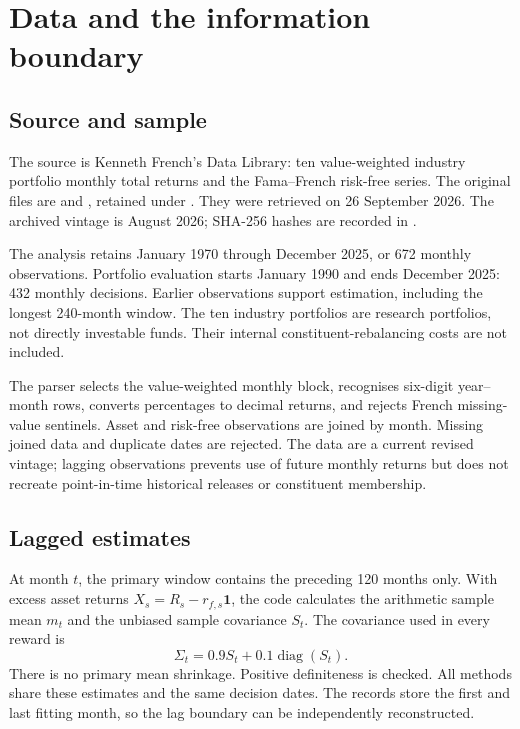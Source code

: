 \documentclass[11pt,a4paper]{article}
\begin{document}
\section{Data and the information boundary}
\subsection{Source and sample}
The source is Kenneth French's Data Library: ten value-weighted industry portfolio monthly total returns and the Fama--French risk-free series. The original files are  and , retained under . They were retrieved on 26 September 2026. The archived vintage is August 2026; SHA-256 hashes are recorded in .

The analysis retains January 1970 through December 2025, or 672 monthly observations. Portfolio evaluation starts January 1990 and ends December 2025: 432 monthly decisions. Earlier observations support estimation, including the longest 240-month window. The ten industry portfolios are research portfolios, not directly investable funds. Their internal constituent-rebalancing costs are not included.

The parser selects the value-weighted monthly block, recognises six-digit year--month rows, converts percentages to decimal returns, and rejects French missing-value sentinels. Asset and risk-free observations are joined by month. Missing joined data and duplicate dates are rejected. The data are a current revised vintage; lagging observations prevents use of future monthly returns but does not recreate point-in-time historical releases or constituent membership.

\subsection{Lagged estimates}
At month $t$, the primary window contains the preceding 120 months only. With excess asset returns $X_s=R_s-r_{f,s}\mathbf1$, the code calculates the arithmetic sample mean $m_t$ and the unbiased sample covariance $S_t$. The covariance used in every reward is
\[
\Sigma_t=0.9S_t+0.1\operatorname{diag}(S_t).
\]
There is no primary mean shrinkage. Positive definiteness is checked. All methods share these estimates and the same decision dates. The records store the first and last fitting month, so the lag boundary can be independently reconstructed.
\end{document}
